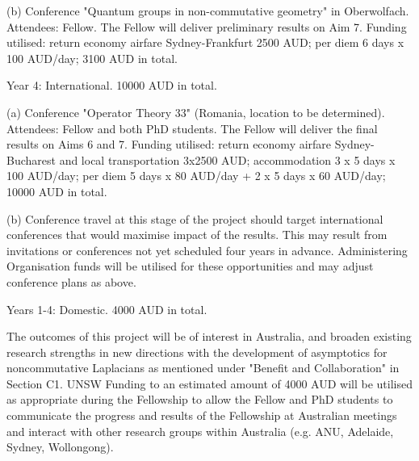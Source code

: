 \documentclass[12pt]{article}
\begin{document}
(b) Conference "Quantum groups in non-commutative geometry" in Oberwolfach. Attendees: Fellow. The Fellow will deliver preliminary results on Aim 7. Funding utilised: return economy airfare Sydney-Frankfurt 2500 AUD; per diem 6 days x 100 AUD/day; 3100 AUD in total.

\smallskip Year 4: International. 10000 AUD in total.

\smallskip  (a) Conference "Operator Theory 33" (Romania, location to be determined). Attendees: Fellow and both PhD students. The Fellow will deliver the final results on Aims 6 and 7. Funding utilised: return economy airfare Sydney-Bucharest and local transportation 3x2500 AUD; accommodation 3 x 5 days x 100 AUD/day; per diem 5 days x 80 AUD/day + 2 x 5 days x 60 AUD/day; 10000 AUD in total.

(b) Conference travel at this stage of the project should target international conferences that would maximise impact of the results. This may result from invitations or conferences not yet scheduled four years in advance. Administering Organisation funds will be utilised for these opportunities and may adjust conference plans as above.

\smallskip Years 1-4: Domestic. 4000 AUD in total.

\smallskip The outcomes of this project will be of interest in Australia, and broaden existing research strengths in new directions with the development of asymptotics for noncommutative Laplacians as mentioned under "Benefit and Collaboration" in Section C1. UNSW Funding to an estimated amount of 4000 AUD will be utilised as appropriate during the Fellowship to allow the Fellow and PhD students to communicate the progress and results of the Fellowship at Australian meetings and interact with other research groups within Australia (e.g. ANU, Adelaide, Sydney, Wollongong).
\end{document}
